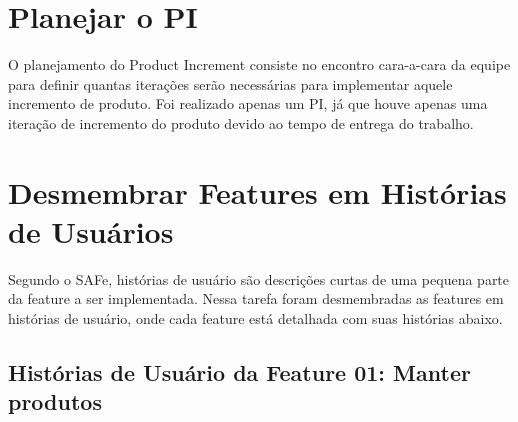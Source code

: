\section{Planejar o PI}
O planejamento do Product Increment consiste no encontro cara-a-cara da equipe para definir quantas iterações serão necessárias para implementar aquele incremento de produto.
Foi realizado apenas um PI, já que houve apenas uma iteração de incremento do produto devido ao tempo de entrega do trabalho.

\section{Desmembrar Features em Histórias de Usuários}
Segundo o SAFe, histórias de usuário são descrições curtas de uma pequena parte da feature a ser implementada.
Nessa tarefa foram desmembradas as features em histórias de usuário, onde cada feature está detalhada com suas histórias abaixo.

\subsection{Histórias de Usuário da Feature 01: Manter produtos}

